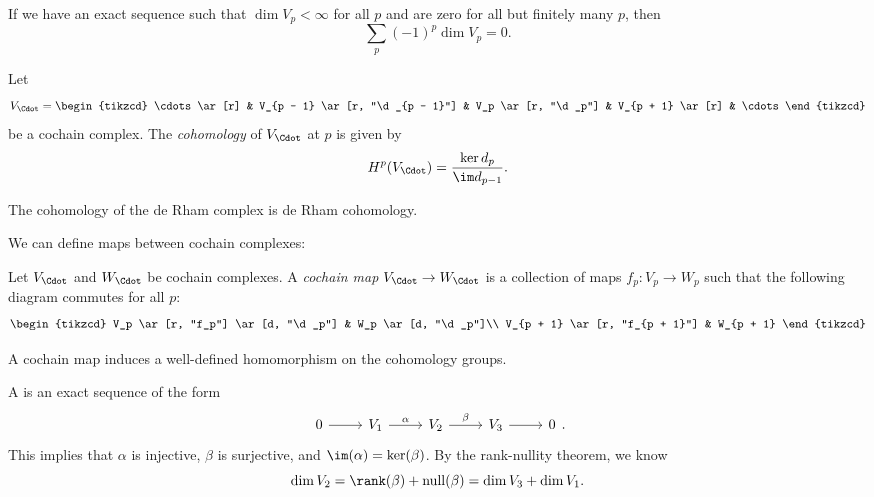 \documentclass[a4paper]{article}
\begin{document}
\begin{eg}
  If we have an exact sequence such that $\dim V_p < \infty$ for all $p$ and are zero for all but finitely many $p$, then
  \[
    \sum_p (-1)^p \dim V_p = 0.
  \]
\end{eg}

\begin{defi}[Cohomology]
  Let
  \[
    V_{\Cdot} =
    \begin{tikzcd}
      \cdots \ar[r] & V_{p - 1} \ar[r, "\d_{p - 1}"] & V_p \ar[r, "\d_p"] & V_{p + 1} \ar[r] & \cdots
    \end{tikzcd}
  \]
  be a cochain complex. The \emph{cohomology} of $V_{\Cdot}$ at $p$ is given by
  \[
    H^p(V_{\Cdot}) = \frac{\ker d_p}{\im d_{p - 1}}.
  \]
\end{defi}

\begin{eg}
  The cohomology of the de Rham complex is de Rham cohomology.
\end{eg}

We can define maps between cochain complexes:
\begin{defi}
  Let $V_{\Cdot}$ and $W_\Cdot$ be cochain complexes. A \emph{cochain map} $V_{\Cdot} \to W_{\Cdot}$ is a collection of maps $f_p: V_p \to W_p$ such that the following diagram commutes for all $p$:
   \[
     \begin{tikzcd}
       V_p \ar[r, "f_p"] \ar[d, "\d_p"] & W_p \ar[d, "\d_p"]\\
       V_{p + 1} \ar[r, "f_{p + 1}"] & W_{p + 1}
     \end{tikzcd}
   \]
\end{defi}

\begin{prop}
  A cochain map induces a well-defined homomorphism on the cohomology groups.
\end{prop}

\begin{defi}
  A  is an exact sequence of the form
  \[
    \begin{tikzcd}
      0 \ar[r] & V_1 \ar[r, "\alpha"] & V_2 \ar[r, "\beta"] & V_3 \ar[r] & 0
    \end{tikzcd}.
  \]
  This implies that $\alpha$ is injective, $\beta$ is surjective, and $\im (\alpha) = \ker(\beta)$. By the rank-nullity theorem, we know
  \[
    \dim V_2 = \rank(\beta) + \mathrm{null}(\beta) = \dim V_3 + \dim V_1.
  \]
\end{defi}
\end{document}
